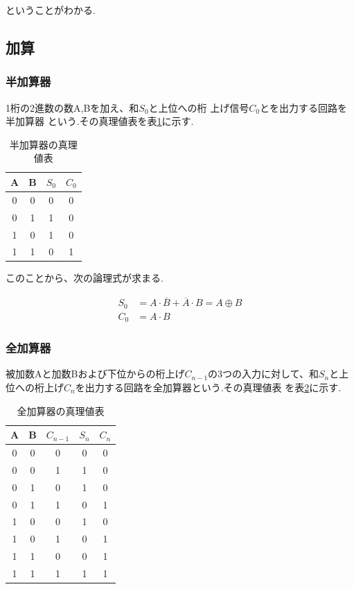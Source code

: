 \documentclass[titlepage]{jsarticle}
\theoremstyle{definition}
\begin{document}
ということがわかる.

\subsection{加算}

\subsubsection{半加算器}
1桁の2進数の数A,Bを加え、和$S_0$と上位への桁
上げ信号$C_0$とを出力する回路を半加算器
という.その真理値表を表\ref{hankasan1}に示す.

\begin{table}[htbp]
	\caption{半加算器の真理値表}
	\label{hankasan1}
	\centering
	\begin{tabular}{|c|c||c|c|} \hline
		A & B & $S_0$ & $C_0$ \\ \hline \hline
		0 & 0 & 0 & 0 \\ \hline
		0 & 1 & 1 & 0 \\ \hline
		1 & 0 & 1 & 0 \\ \hline
		1 & 1 & 0 & 1 \\ \hline
	\end{tabular}
\end{table}

このことから、次の論理式が求まる.

\begin{align}
	S_0 &= A \cdot \overline{B} + \overline{A} \cdot B = A \oplus B \\
	C_0 &= A \cdot B
\end{align}



\subsubsection{全加算器}
被加数Aと加数Bおよび下位からの桁上げ$C_{n−1}$の3つの入力に対して、和$S_n$と上
位への桁上げ$C_n$を出力する回路を全加算器という.その真理値表
を表\ref{zenkasan1}に示す.

\begin{table}[htbp]
	\caption{全加算器の真理値表}
	\label{zenkasan1}
	\centering
	\begin{tabular}{|c|c|c||c|c|} \hline
		A & B & $C_{n-1}$ & $S_n$ & $C_n$ \\ \hline \hline
		0 & 0 & 0 & 0 & 0 \\ \hline
		0 & 0 & 1 & 1 & 0 \\ \hline
		0 & 1 & 0 & 1 & 0 \\ \hline
		0 & 1 & 1 & 0 & 1 \\ \hline
		1 & 0 & 0 & 1 & 0 \\ \hline
		1 & 0 & 1 & 0 & 1 \\ \hline
		1 & 1 & 0 & 0 & 1 \\ \hline
		1 & 1 & 1 & 1 & 1 \\ \hline
	\end{tabular}
\end{table}
\end{document}
